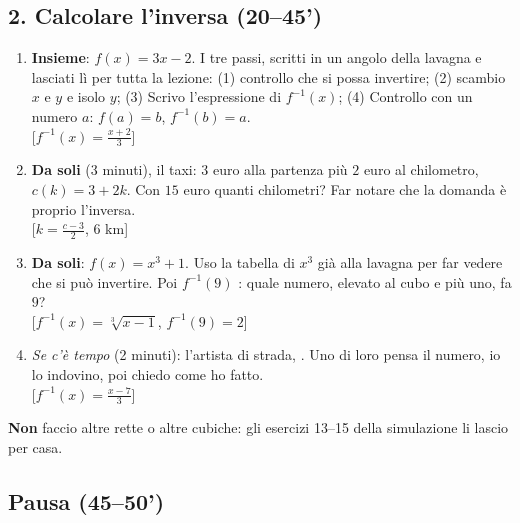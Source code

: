 \documentclass[11pt]{report}
\begin{document}
\subsection*{2. Calcolare l'inversa (20--45')}
\begin{enumerate}
  \item \textbf{Insieme}: $f(x)=3x-2$. I tre passi, scritti in un angolo della lavagna e lasciati lì per tutta la lezione: (1) controllo che si possa invertire; (2) scambio $x$ e $y$ e isolo $y$; (3) Scrivo l'espressione di $f^{-1}(x)$; (4) Controllo con un numero $a$: $f(a)=b$, $f^{-1}(b)=a$.\\
  {}[$f^{-1}(x)=\frac{x+2}{3}$]
  \item \textbf{Da soli} (3 minuti), il taxi: $3$ euro alla partenza più $2$ euro al chilometro, $c(k)=3+2k$. Con $15$ euro quanti chilometri? Far notare che la domanda  è proprio l'inversa.\\
  {}[$k=\frac{c-3}{2}$, $6$ km]
  \item \textbf{Da soli}: $f(x)=x^3+1$. Uso la tabella di $x^3$ già alla lavagna per far vedere che si può invertire. Poi $f^{-1}(9)$ : quale numero, elevato al cubo e più uno, fa $9$?\\
  {}[$f^{-1}(x)=\sqrt[3]{x-1}$, $f^{-1}(9)=2$]
  \item \emph{Se c'è tempo} (2 minuti): l'artista di strada, . Uno di loro pensa il numero, io lo indovino, poi chiedo come ho fatto.\\
  {}[$f^{-1}(x)=\frac{x-7}{3}$]
\end{enumerate}
\textbf{Non} faccio altre rette o altre cubiche: gli esercizi 13--15 della simulazione li lascio per casa.

\subsection*{Pausa (45--50')}
\end{document}
